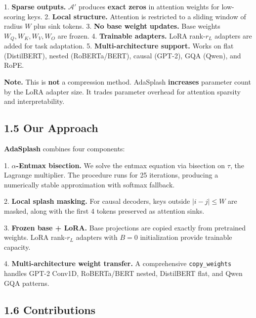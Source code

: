 1. \textbf{Sparse outputs.} $\mathcal{A}'$ produces \textbf{exact zeros} in attention 
   weights for low-scoring keys.
2. \textbf{Local structure.} Attention is restricted to a sliding window of radius 
   $W$ plus sink tokens.
3. \textbf{No base weight updates.} Base weights $W_Q, W_K, W_V, W_O$ are frozen.
4. \textbf{Trainable adapters.} LoRA rank-$r_L$ adapters are added for task adaptation.
5. \textbf{Multi-architecture support.} Works on flat (DistilBERT), nested 
   (RoBERTa/BERT), causal (GPT-2), GQA (Qwen), and RoPE.

\textbf{Note.} This is \textbf{not} a compression method. AdaSplash \textbf{increases} 
parameter count by the LoRA adapter size. It trades parameter overhead for 
attention sparsity and interpretability.

\subsection{1.5 Our Approach}

\textbf{AdaSplash} combines four components:

1. \textbf{$\alpha$-Entmax bisection.} We solve the entmax equation via bisection on 
   $\tau$, the Lagrange multiplier. The procedure runs for 25 iterations, 
   producing a numerically stable approximation with softmax fallback.

2. \textbf{Local splash masking.} For causal decoders, keys outside $|i - j| \leq W$ 
   are masked, along with the first 4 tokens preserved as attention sinks.

3. \textbf{Frozen base + LoRA.} Base projections are copied exactly from pretrained 
   weights. LoRA rank-$r_L$ adapters with $B = 0$ initialization provide 
   trainable capacity.

4. \textbf{Multi-architecture weight transfer.} A comprehensive \texttt{copy\_weights} 
   handles GPT-2 Conv1D, RoBERTa/BERT nested, DistilBERT flat, and Qwen 
   GQA patterns.

\subsection{1.6 Contributions}

